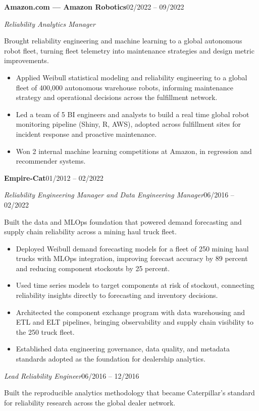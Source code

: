 \documentclass[10pt]{article}
\newcommand{\companyentry}[3]{%
  \smallskip\textbf{#1}\hspace{0.4em}{\color{slate}\small #2}\hfill{\color{slate}\small #3}\par}
\newcommand{\roledated}[2]{%
  \textit{#1}\hfill{\color{slate}\small #2}\par\vspace{1pt}}
\newcommand{\role}[1]{\textit{#1}\par\vspace{1pt}}
\begin{document}
\companyentry{Amazon.com --- Amazon Robotics}{Tempe, AZ}{02/2022 -- 09/2022}
\role{Reliability Analytics Manager}
Brought reliability engineering and machine learning to a global autonomous robot fleet, turning fleet telemetry into maintenance strategies and design metric improvements.
\begin{itemize}
    \item Applied Weibull statistical modeling and reliability engineering to a global fleet of 400,000 autonomous warehouse robots, informing maintenance strategy and operational decisions across the fulfillment network.
    \item Led a team of 5 BI engineers and analysts to build a real time global robot monitoring pipeline (Shiny, R, AWS), adopted across fulfillment sites for incident response and proactive maintenance.
    \item Won 2 internal machine learning competitions at Amazon, in regression and recommender systems.
\end{itemize}

\companyentry{Empire-Cat}{Mesa, AZ}{01/2012 -- 02/2022}
\roledated{Reliability Engineering Manager and Data Engineering Manager}{06/2016 -- 02/2022}
Built the data and MLOps foundation that powered demand forecasting and supply chain reliability across a mining haul truck fleet.

\begin{itemize}
    \item Deployed Weibull demand forecasting models for a fleet of 250 mining haul trucks with MLOps integration, improving forecast accuracy by 89 percent and reducing component stockouts by 25 percent.
    \item Used time series models to target components at risk of stockout, connecting reliability insights directly to forecasting and inventory decisions.
    \item Architected the component exchange program with data warehousing and ETL and ELT pipelines, bringing observability and supply chain visibility to the 250 truck fleet.
    \item Established data engineering governance, data quality, and metadata standards adopted as the foundation for dealership analytics.
\end{itemize}


\roledated{Lead Reliability Engineer}{06/2016 -- 12/2016}
Built the reproducible analytics methodology that became Caterpillar's standard for reliability research across the global dealer network.
\end{document}
